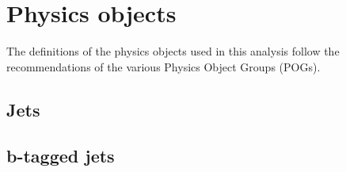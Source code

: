 \clearpage
\section{Physics objects\label{sec:reconstruction}}

The definitions of the physics objects used in this analysis follow
the recommendations of the various Physics Object Groups (POGs).

\subsection{Jets}

%


\subsection{b-tagged jets\label{sec:b-tagging}}


